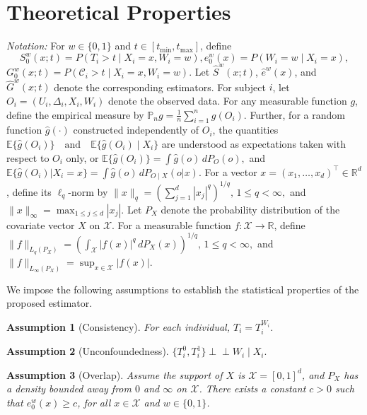 \documentclass{article}
\newcommand{\E}{\mathbb{E}}
\newtheorem{assumption}{Assumption}
\newcommand{\indep}{\mathrel{\perp\!\!\!\perp}}
\begin{document}
\section{Theoretical Properties} \label{theory}
{\em Notation:} 
 For $w \in \{0,1\}$ and $t \in [t_{\min}, t_{\max}]$, define
\[
S_0^w(x;t) = P(T_i > t \mid X_i = x, W_i = w), 
e_0^w(x) = P(W_i = w \mid X_i = x), \]
\(G_0^w(x;t) = P(\mathcal{C}_i > t \mid X_i = x, W_i = w).
\)
Let $\hat S^w(x;t)$, $\hat e^w(x)$, and $\hat G^w(x;t)$ denote the corresponding estimators.  
For subject $i$, let
\(
O_i = (U_i, \Delta_i, X_i, W_i)
\)
denote the observed data. For any measurable function $g$, define the empirical measure by
\(
\mathbb{P}_n g = \frac{1}{n}\sum_{i=1}^n g(O_i).
\)
Further, for a random function $\hat g(\cdot)$ constructed independently of $O_i$, the quantities
\(
\E\{\hat g(O_i)\}
\quad\text{and}\quad
\E\{\hat g(O_i)\mid X_i\}
\)
are understood as expectations taken with respect to $O_i$ only, or
\(
\E\{\hat g(O_i)\}
=
\int \hat g(o)\, dP_{O}(o), \) and 
\(
\E\{\hat g(O_i)|X_i=x\}
=
\int \hat g(o)\, dP_{O\mid X}(o|x).
\)
For a vector \(x=(x_1,\ldots,x_d)^\top\in\mathbb R^d\), define its \(\ell_q\)-norm by
\(
\|x\|_q
=
\left(\sum_{j=1}^d |x_j|^q\right)^{1/q},
\, 1\le q<\infty,
\)
and
\(
\|x\|_\infty
=
\max_{1\le j\le d}|x_j|.
\)
 Let \(P_X\) denote the probability distribution of the covariate vector \(X\) on \(\mathcal X\). For a measurable function \(f:\mathcal X\to\mathbb R\), define
\(
\|f\|_{L_q(P_X)}
=
\left(\int_{\mathcal X} |f(x)|^q\, dP_X(x)\right)^{1/q},
\, 1\le q<\infty,
\)
and
\(
\|f\|_{L_\infty(P_X)}
=
\sup_{x\in\mathcal X} |f(x)|.
\)

 We impose the following assumptions to establish the statistical properties of the proposed estimator.

\begin{assumption}[Consistency]\label{assum_consistency}
For each individual,
\(
T_i = T_i^{W_i}.
\)
\end{assumption}

\begin{assumption}[Unconfoundedness]\label{assum_unconfoundedness}
\(
\{T_i^0, T_i^1\} \indep W_i \mid X_i.
\)
\end{assumption}

\begin{assumption}[Overlap]\label{assum_overlap}
 Assume the support of $X$ is $\mathcal X=[0,1]^d$, and $P_X$ has a density bounded away from $0$ and $\infty$ on $\mathcal X$.
There exists a constant $c > 0$ such that \(
e_0^w(x) \ge c
\), for all $x \in \mathcal X$ and $w \in \{0,1\}$.
\end{assumption}
\end{document}
